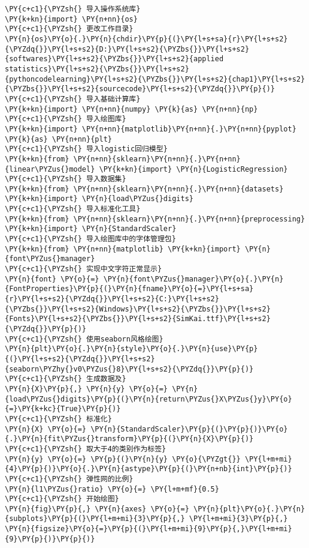 \begin{Verbatim}[commandchars=\\\{\}]
\PY{c+c1}{\PYZsh{} 导入操作系统库}
\PY{k+kn}{import} \PY{n+nn}{os}
\PY{c+c1}{\PYZsh{} 更改工作目录}
\PY{n}{os}\PY{o}{.}\PY{n}{chdir}\PY{p}{(}\PY{l+s+sa}{r}\PY{l+s+s2}{\PYZdq{}}\PY{l+s+s2}{D:}\PY{l+s+s2}{\PYZbs{}}\PY{l+s+s2}{softwares}\PY{l+s+s2}{\PYZbs{}}\PY{l+s+s2}{applied statistics}\PY{l+s+s2}{\PYZbs{}}\PY{l+s+s2}{pythoncodelearning}\PY{l+s+s2}{\PYZbs{}}\PY{l+s+s2}{chap1}\PY{l+s+s2}{\PYZbs{}}\PY{l+s+s2}{sourcecode}\PY{l+s+s2}{\PYZdq{}}\PY{p}{)}
\PY{c+c1}{\PYZsh{} 导入基础计算库}
\PY{k+kn}{import} \PY{n+nn}{numpy} \PY{k}{as} \PY{n+nn}{np}
\PY{c+c1}{\PYZsh{} 导入绘图库}
\PY{k+kn}{import} \PY{n+nn}{matplotlib}\PY{n+nn}{.}\PY{n+nn}{pyplot} \PY{k}{as} \PY{n+nn}{plt}
\PY{c+c1}{\PYZsh{} 导入logistic回归模型}
\PY{k+kn}{from} \PY{n+nn}{sklearn}\PY{n+nn}{.}\PY{n+nn}{linear\PYZus{}model} \PY{k+kn}{import} \PY{n}{LogisticRegression}
\PY{c+c1}{\PYZsh{} 导入数据集}
\PY{k+kn}{from} \PY{n+nn}{sklearn}\PY{n+nn}{.}\PY{n+nn}{datasets} \PY{k+kn}{import} \PY{n}{load\PYZus{}digits}
\PY{c+c1}{\PYZsh{} 导入标准化工具}
\PY{k+kn}{from} \PY{n+nn}{sklearn}\PY{n+nn}{.}\PY{n+nn}{preprocessing} \PY{k+kn}{import} \PY{n}{StandardScaler}
\PY{c+c1}{\PYZsh{} 导入绘图库中的字体管理包}
\PY{k+kn}{from} \PY{n+nn}{matplotlib} \PY{k+kn}{import} \PY{n}{font\PYZus{}manager}
\PY{c+c1}{\PYZsh{} 实现中文字符正常显示}
\PY{n}{font} \PY{o}{=} \PY{n}{font\PYZus{}manager}\PY{o}{.}\PY{n}{FontProperties}\PY{p}{(}\PY{n}{fname}\PY{o}{=}\PY{l+s+sa}{r}\PY{l+s+s2}{\PYZdq{}}\PY{l+s+s2}{C:}\PY{l+s+s2}{\PYZbs{}}\PY{l+s+s2}{Windows}\PY{l+s+s2}{\PYZbs{}}\PY{l+s+s2}{Fonts}\PY{l+s+s2}{\PYZbs{}}\PY{l+s+s2}{SimKai.ttf}\PY{l+s+s2}{\PYZdq{}}\PY{p}{)}
\PY{c+c1}{\PYZsh{} 使用seaborn风格绘图}
\PY{n}{plt}\PY{o}{.}\PY{n}{style}\PY{o}{.}\PY{n}{use}\PY{p}{(}\PY{l+s+s2}{\PYZdq{}}\PY{l+s+s2}{seaborn\PYZhy{}v0\PYZus{}8}\PY{l+s+s2}{\PYZdq{}}\PY{p}{)}
\PY{c+c1}{\PYZsh{} 生成数据及}
\PY{n}{X}\PY{p}{,} \PY{n}{y} \PY{o}{=} \PY{n}{load\PYZus{}digits}\PY{p}{(}\PY{n}{return\PYZus{}X\PYZus{}y}\PY{o}{=}\PY{k+kc}{True}\PY{p}{)}
\PY{c+c1}{\PYZsh{} 标准化}
\PY{n}{X} \PY{o}{=} \PY{n}{StandardScaler}\PY{p}{(}\PY{p}{)}\PY{o}{.}\PY{n}{fit\PYZus{}transform}\PY{p}{(}\PY{n}{X}\PY{p}{)}
\PY{c+c1}{\PYZsh{} 取大于4的类别作为标签}
\PY{n}{y} \PY{o}{=} \PY{p}{(}\PY{n}{y} \PY{o}{\PYZgt{}} \PY{l+m+mi}{4}\PY{p}{)}\PY{o}{.}\PY{n}{astype}\PY{p}{(}\PY{n+nb}{int}\PY{p}{)}
\PY{c+c1}{\PYZsh{} 弹性网的比例}
\PY{n}{l1\PYZus{}ratio} \PY{o}{=} \PY{l+m+mf}{0.5}
\PY{c+c1}{\PYZsh{} 开始绘图}
\PY{n}{fig}\PY{p}{,} \PY{n}{axes} \PY{o}{=} \PY{n}{plt}\PY{o}{.}\PY{n}{subplots}\PY{p}{(}\PY{l+m+mi}{3}\PY{p}{,} \PY{l+m+mi}{3}\PY{p}{,} \PY{n}{figsize}\PY{o}{=}\PY{p}{(}\PY{l+m+mi}{9}\PY{p}{,}\PY{l+m+mi}{9}\PY{p}{)}\PY{p}{)}

\end{Verbatim}
